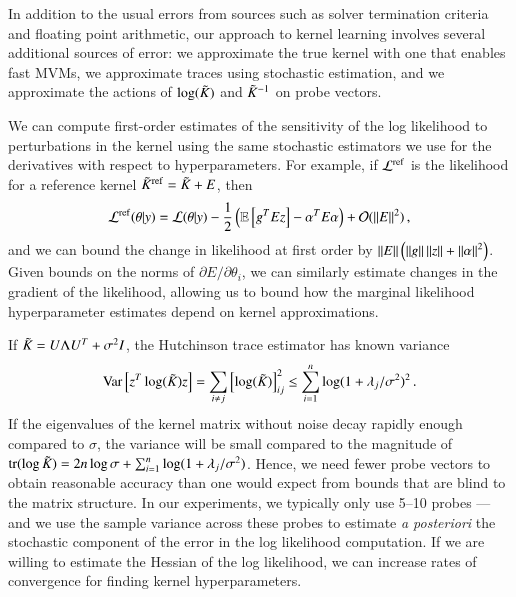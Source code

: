 In addition to the usual errors from sources such as solver termination criteria
and floating point arithmetic, our approach to kernel learning involves several
additional sources of error: we approximate the true kernel with one that
enables fast MVMs, we approximate traces using stochastic estimation, and we
approximate the actions of $\log(\tilde{K}_{})$ and $\tilde{K}_{}^{-1}$ on probe
vectors.

We can compute first-order estimates of the sensitivity of the log likelihood to
perturbations in the kernel using the same stochastic estimators we use for the
derivatives with respect to hyperparameters. For example, if $\mathcal{L}^{\operatorname{ref}}$
is the likelihood for a reference kernel $\tilde{K}_{}^{\operatorname{ref}} = \tilde{K}_{} + E$, then
\begin{equation}
  \mathcal{L}^{\operatorname{ref}}(\theta|y) = \mathcal{L}(\theta|y) - \frac{1}{2} \left(\operatorname{\mathbb{E}}\left
  [g^TEz\right] - \alpha^T E \alpha \right) + \mathcal{O}(\left\lVert E\right\rVert^2)\,,
\end{equation}
and we can bound the change in likelihood at first order by $\left\lVert E\right\rVert\left(
\left\lVert g\right\rVert\left\lVert z\right\rVert + \left\lVert\alpha\right\rVert^2 \right)$. Given bounds on the norms of
$\partial E/\partial \theta_i$, we can similarly estimate changes in the
gradient of the likelihood, allowing us to bound how the marginal likelihood
hyperparameter estimates depend on kernel approximations.

If $\tilde{K}_{} = U \Lambda U^T + \sigma^2 I$, the Hutchinson trace estimator has
known variance~\cite{Avron:2011:Randomized}
\begin{equation}
  \operatorname{Var}\left[z^T \log(\tilde{K}_{}) z\right] = \sum_{i \neq j} \left[\log(\tilde{K}_{})\right]_{ij}^2 \leq \sum_{i=1}^n \log(1 + \lambda_j/\sigma^2)^2\,.
\end{equation}
If the eigenvalues of the kernel matrix without noise decay rapidly enough
compared to $\sigma$, the variance will be small compared to the magnitude of
$\operatorname{tr}(\log \tilde{K}_{}) = 2n\log \sigma + \sum_{i=1}^n\log(1+\lambda_j/\sigma^2)$.
Hence, we need fewer probe vectors to obtain reasonable accuracy than one would
expect from bounds that are blind to the matrix structure. In our experiments,
we typically only use 5--10 probes --- and we use the sample variance across
these probes to estimate {\em a posteriori} the stochastic component of the
error in the log likelihood computation.  If we are willing to estimate the
Hessian of the log likelihood, we can increase rates of convergence for finding
kernel hyperparameters.

